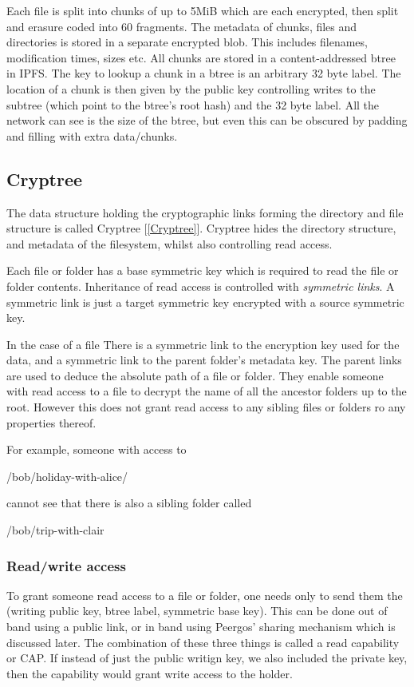 \documentclass[12pt]{article}
\begin{document}
Each file is split into chunks of up to 5MiB which are each encrypted, then split and erasure coded into 60 fragments. The metadata of chunks, files and directories is stored in a separate encrypted blob. This includes filenames, modification times, sizes etc. All chunks are stored in a content-addressed btree in IPFS. The key to lookup a chunk in a btree is an arbitrary 32 byte label. The location of a chunk is then given by the public key controlling writes to the subtree (which point to the btree's root hash) and the 32 byte label. All the network can see is the size of the btree, but even this can be obscured by padding and filling with extra data/chunks. 

\subsection*{Cryptree}
The data structure holding the cryptographic links forming the directory and file structure is called Cryptree [\ref{Cryptree}]. Cryptree hides the directory structure, and metadata of the filesystem, whilst also controlling read access. 


Each file or folder has a base symmetric key which is required to read the file or folder contents. Inheritance of read access is controlled with \emph{symmetric links}. A symmetric link is just a target symmetric key encrypted with a source symmetric key.

In the case of a file There is a symmetric link to the encryption key used for the data, and a symmetric link to the parent folder's metadata key. The parent links are used to deduce the absolute path of a file or folder. They enable someone with read access to a file to decrypt the name of all the ancestor folders up to the root. However this does not grant read access to any sibling files or folders ro any properties thereof.

For example, someone with access to

/bob/holiday-with-alice/

cannot see that there is also a sibling folder called

/bob/trip-with-clair


\subsubsection*{Read/write access}
To grant someone read access to a file or folder, one needs only to send them the (writing public key, btree label, symmetric base key). This can be done out of band using a public link, or in band using Peergos' sharing mechanism which is discussed later. The combination of these three things is called a read capability or CAP. If instead of just the public writign key, we also included the private key, then the capability would grant write access to the holder. 
\end{document}
